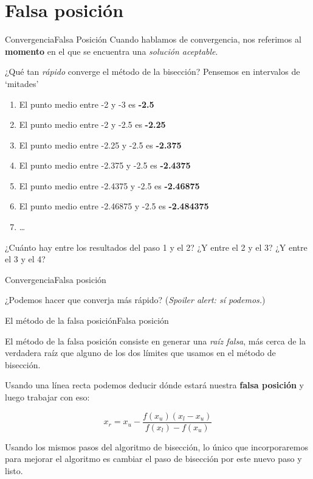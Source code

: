 \documentclass[spanish, c]{beamer}
\begin{document}
\section{Falsa posición}

\begin{frame}{Convergencia}{Falsa Posición}
    Cuando hablamos de \alert{convergencia}, nos referimos al \textbf{momento} en el que se encuentra una \textit{solución aceptable}. \pause
    
    \bigskip

    ¿Qué tan \textit{rápido} converge el método de la bisección? Pensemos en intervalos de `mitades' \pause

    \bigskip

    \begin{enumerate}[<+->]
        \item El punto medio entre -2 y -3 es \textbf{-2.5}
        \item El punto medio entre -2 y -2.5 es \textbf{-2.25}
        \item El punto medio entre -2.25 y -2.5 es \textbf{-2.375}
        \item El punto medio entre -2.375 y -2.5 es \textbf{-2.4375}
        \item El punto medio entre -2.4375 y -2.5 es \textbf{-2.46875}
        \item El punto medio entre -2.46875 y -2.5 es \textbf{-2.484375}
        \item \dots
    \end{enumerate} \pause

    ¿Cuánto hay entre los resultados del paso 1 y el 2? \pause ¿Y entre el 2 y el 3? ¿Y entre el 3 y el 4?
\end{frame}

\begin{frame}{Convergencia}{Falsa posición}
    \begin{center}
        {\huge ¿Podemos hacer que converja más rápido?}
        (\textit{Spoiler alert: sí podemos.})
    \end{center}
\end{frame}

\begin{frame}{El método de la falsa posición}{Falsa posición}

    El método de la \alert{falsa posición} consiste en generar una \textit{raíz falsa}, más cerca de la verdadera raíz que alguno de los dos límites que usamos en el método de bisección. \pause

    \bigskip

    Usando una línea recta podemos deducir dónde estará nuestra \textbf{falsa posición} y luego trabajar con eso:

    $$ x_r = x_u - \frac{f(x_u)(x_l - x_u)}{f(x_l) - f(x_u)}$$ \pause

    Usando los mismos pasos del algoritmo de bisección, lo único que incorporaremos para mejorar el algoritmo es cambiar el paso de bisección por este nuevo paso y listo.

\end{frame}
\end{document}
